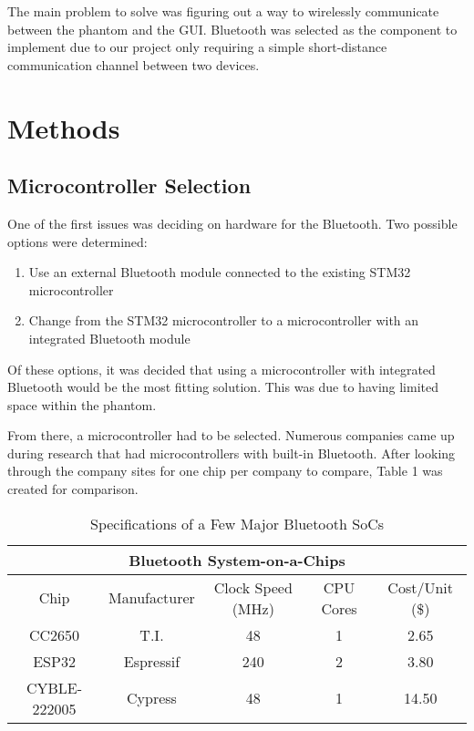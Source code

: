 \documentclass[12pt, titlepage]{article}
\begin{document}
The main problem to solve was figuring out a way to wirelessly communicate between the phantom and the GUI. Bluetooth was selected as the component to implement due to our project only requiring a simple short-distance communication channel between two devices. 

\section{Methods}
\subsection{Microcontroller Selection}
One of the first issues was deciding on hardware for the Bluetooth. Two possible options were determined:

\begin{enumerate}
  \item Use an external Bluetooth module connected to the existing STM32 microcontroller
  \item Change from the STM32 microcontroller to a microcontroller with an integrated Bluetooth module
\end{enumerate}

Of these options, it was decided that using a microcontroller with integrated Bluetooth would be the most fitting solution. This was due to having limited space within the phantom.

From there, a microcontroller had to be selected. Numerous companies came up during research that had microcontrollers with built-in Bluetooth. After looking through the company sites for one chip per company to compare, Table 1 was created for comparison.

\begin{table}[h!]
    \centering
    \begin{tabular}{|c c c c c|}
        \hline
        \multicolumn{5}{|c|}{Bluetooth System-on-a-Chips} \\
        \hline
        Chip & Manufacturer & Clock Speed (MHz) & CPU Cores & Cost/Unit (\$)\\
        \hline
        CC2650 \cite{cc2650} & T.I.      & 48  & 1 & 2.65 \\
        ESP32  \cite{esp32}  & Espressif & 240 & 2 & 3.80 \\
        CYBLE-222005 \cite{cyble} & Cypress & 48 & 1 & 14.50 \\
        \hline
    \end{tabular}
    \caption{Specifications of a Few Major Bluetooth SoCs}
    \label{tab:mcuspecs}
\end{table}
\end{document}
